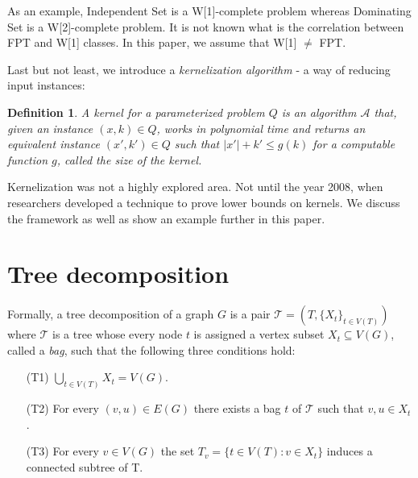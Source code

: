 \documentclass[en]{pracamgr}
\newtheorem{definition}{Definition}
\newcommand{\domsetp}{{\sc Dominating Set}}
\newcommand{\indset}{{\sc Independent Set}}
\begin{document}
As an example, \indset{} is a W[1]-complete problem whereas \domsetp{} is a W[2]-complete problem. It is not known what is the correlation between FPT and W[1] classes. In this paper, we assume that W[1] $\neq$ FPT. 



Last but not least, we introduce a \emph{kernelization algorithm} - a way of reducing input instances:

\begin{definition}\label{Kernel}
	A \textup{kernel} for a parameterized problem $Q$ is an algorithm $\mathcal{A}$ that, given an instance $(x,k) \in Q$, works in polynomial time and returns an equivalent instance $(x',k') \in Q$
	such that $|x'| + k' \leq g(k)$ for a computable function $g$, called the \textup{size} of the kernel.
\end{definition}

Kernelization was not a highly explored area. Not until the year 2008, when researchers developed a technique to prove lower bounds on kernels. We discuss the framework as well as show an example further in this paper.

\section{Tree decomposition}

Formally, a tree decomposition of a graph $G$ is a pair $\mathcal{T} = (T, \{X_t\}_{t\in V(T)})$ where $\mathcal{T}$ is a tree whose every node $t$ is assigned a vertex subset $X_t \subseteq V(G)$, called a \emph{bag}, such that the following three conditions hold:
\begin{itemize}
	\item[(T1)] $\bigcup_{t\in V(T)}X_t = V(G)$.
	\item[(T2)] For every $(v,u) \in E(G)$ there exists a bag $t$ of $\mathcal{T}$ such that $v,u \in X_t$.
	\item[(T3)] For every $v \in V(G)$ the set $T_v = \{t \in V(T): v \in X_t\}$ induces a connected subtree of T.
\end{itemize}
\end{document}
